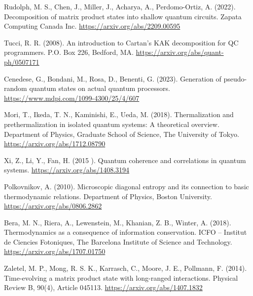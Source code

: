 \begin{thebibliography}{a}
Rudolph, M. S., Chen, J., Miller, J., Acharya, A.,  Perdomo-Ortiz, A. (2022). Decomposition of matrix product states into shallow quantum circuits. Zapata Computing Canada Inc.
\url{https://arxiv.org/abs/2209.00595}

Tucci, R. R. (2008). An introduction to Cartan’s KAK decomposition for QC programmers. P.O. Box 226, Bedford, MA.
\url{https://arxiv.org/abs/quant-ph/0507171}

Cenedese, G., Bondani, M., Rosa, D., Benenti, G. (2023). Generation of pseudo-random quantum states on actual quantum processors.
\url{https://www.mdpi.com/1099-4300/25/4/607}

Mori, T., Ikeda, T. N., Kaminishi, E., Ueda, M. (2018). Thermalization and prethermalization in isolated quantum systems: A theoretical overview. Department of Physics, Graduate School of Science, The University of Tokyo.
\url{https://arxiv.org/abs/1712.08790}

Xi, Z., Li, Y., Fan, H. (2015 ). Quantum coherence and correlations in quantum systems.
\url{https://arxiv.org/abs/1408.3194}

Polkovnikov, A. (2010). Microscopic diagonal entropy and its connection to basic thermodynamic relations. Department of Physics, Boston University.
\url{https://arxiv.org/abs/0806.2862}

Bera, M. N., Riera, A., Lewenstein, M., Khanian, Z. B., Winter, A. (2018). Thermodynamics as a consequence of information conservation. ICFO – Institut de Ciencies Fotoniques, The Barcelona Institute of Science and Technology.
\url{https://arxiv.org/abs/1707.01750}

Zaletel, M. P., Mong, R. S. K., Karrasch, C., Moore, J. E., Pollmann, F. (2014). Time-evolving a matrix product state with long-ranged interactions. Physical Review B, 90(4), Article 045113.
\url{https://arxiv.org/abs/1407.1832}

\end{thebibliography}
%
%